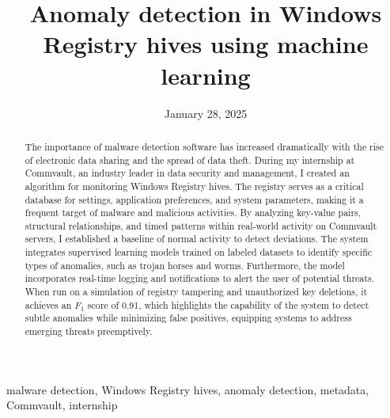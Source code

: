 ﻿\documentclass[12pt,conference,onecolumn]{IEEEtran}
\title{Anomaly detection in Windows Registry hives using machine learning}
\author{%
\IEEEauthorblockN{Krish Patel}\IEEEauthorblockA{Science \& Engineering\\Manalapan High School\\Englishtown, NJ\\425kpatel@frhsd.com}\and
\IEEEauthorblockN{Jitin Jindal}\IEEEauthorblockA{Commvault\\Tinton Falls, NJ\\jjindal@commvault.com}}
\date{January 28, 2025}
\newcommand{\keywords}{malware detection, Windows Registry hives, anomaly detection, metadata, Commvault, internship}
\begin{document}
\maketitle 

\begin{abstract}
The importance of malware detection software has increased dramatically with the rise of electronic data sharing and the spread of data theft. During my internship at Commvault, an industry leader in data security and management, I created an algorithm for monitoring Windows Registry hives. The registry serves as a critical database for settings, application preferences, and system parameters, making it a frequent target of malware and malicious activities. By analyzing key-value pairs, structural relationships, and timed patterns within real-world activity on Commvault servers, I established a baseline of normal activity to detect deviations. The system integrates supervised learning models trained on labeled datasets to identify specific types of anomalies, such as trojan horses and worms. Furthermore, the model incorporates real-time logging and notifications to alert the user of potential threats. When run on a simulation of registry tampering and unauthorized key deletions, it achieves an $F_1$ score of 0.91, which highlights the capability of the system to detect subtle anomalies while minimizing false positives, equipping systems to address emerging threats preemptively.
\end{abstract}

\begin{IEEEkeywords}
\keywords
\end{IEEEkeywords}
\end{document}
